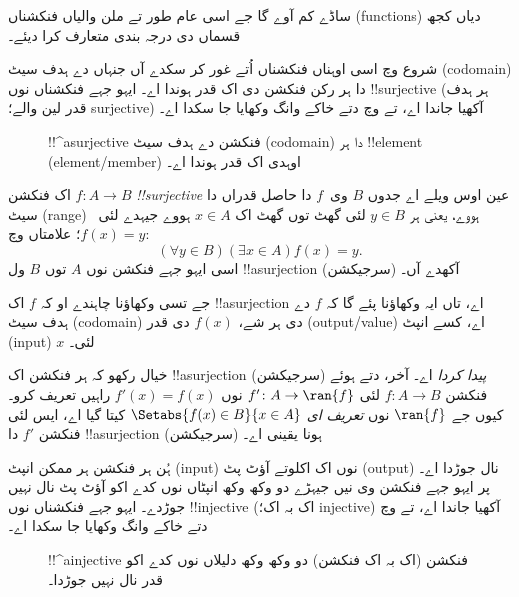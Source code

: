 \documentclass[../../../include/open-logic-section]{subfiles}
\begin{document}

\begin{explain}
ساڈے کم آوے گا جے اسی عام طور تے ملن والیاں فنکشناں (functions) دیاں کجھ
قسماں دی درجہ بندی متعارف کرا دیئے۔

شروع وچ اسی اوہناں فنکشناں اُتے غور کر سکدے آں جنہاں دے ہدف سیٹ
(codomain) دا ہر رکن فنکشن دی اک قدر ہوندا اے۔ ایہو جہے فنکشناں نوں
!!{surjective} (ہر ہدف قدر لین والے؛ surjective) آکھیا جاندا اے، تے
 وچ دتے خاکے وانگ وکھایا جا سکدا اے۔

\begin{figure}
  \caption{!!^a{surjective} فنکشن دے ہدف سیٹ (codomain) دا ہر !!{element}
    (element/member) اوہدی
    اک قدر ہوندا اے۔}
\end{figure}
\end{explain}

\begin{defn}
اک فنکشن $f \colon A \rightarrow B$ \emph{!!{surjective}} عین اوس
ویلے اے جدوں $B$ وی~$f$ دا حاصل قدراں دا سیٹ (range) ہووے، یعنی ہر
$y \in B$ لئی گھٹ توں گھٹ اک $x \in A$ ہووے جیہدے لئی~$f(x) = y$؛
علامتاں وچ:
\[
  (\forall y \in B)(\exists x \in A)f(x) = y.
\]
اسی ایہو جہے فنکشن نوں $A$ توں $B$ ول !!a{surjection} (سرجیکشن)
آکھدے آں۔
\end{defn}

\begin{explain}
جے تسی وکھاؤنا چاہندے او کہ $f$ اک !!a{surjection} اے، تاں ایہ
وکھاؤنا پئے گا کہ $f$ دے ہدف سیٹ (codomain) دی ہر شے، $f(x)$ دی قدر
(output/value) اے، کسے انپٹ (input) $x$ لئی۔

خیال رکھو کہ ہر فنکشن اک !!a{surjection} (سرجیکشن) \emph{پیدا کردا} اے۔ آخر،
دتے ہوئے فنکشن $f \colon A \to B$ لئی $f' \colon A \to \ran{f}$ نوں
$f'(x) = f(x)$ راہیں تعریف کرو۔ کیوں جے $\ran{f}$ نوں
\emph{تعریف ای} $\Setabs{f(x) \in B}{x \in A}$ کیتا گیا اے، ایس
لئی فنکشن $f'$ دا !!a{surjection} (سرجیکشن) ہونا یقینی اے۔
\end{explain}

\begin{explain}
ہُن ہر فنکشن ہر ممکن انپٹ (input) نوں اک اکلوتے آؤٹ پٹ (output) نال جوڑدا اے۔ پر
ایہو جہے فنکشن وی نیں جیہڑے دو وکھ وکھ انپٹاں نوں کدے اکو آؤٹ پٹ
نال نہیں جوڑدے۔ ایہو جہے فنکشناں نوں !!{injective} (اک بہ اک؛ injective)
آکھیا جاندا اے،
تے  وچ دتے خاکے وانگ وکھایا جا سکدا اے۔
\begin{figure}
  \caption{!!^a{injective} فنکشن (اک بہ اک فنکشن) دو وکھ وکھ دلیلاں نوں کدے اکو قدر
    نال نہیں جوڑدا۔}
\end{figure}
\end{explain}
\end{document}
